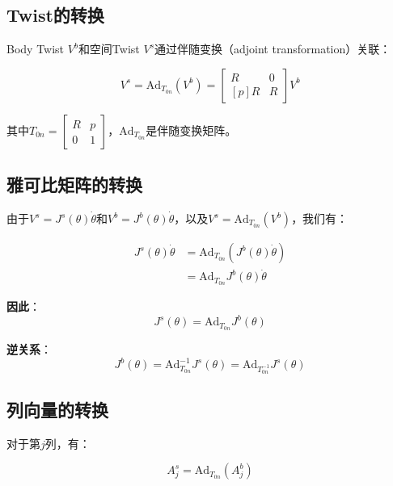 \documentclass[12pt,a4paper]{article}
\begin{document}
\subsection{Twist的转换}

Body Twist $V^b$和空间Twist $V^s$通过伴随变换（adjoint transformation）关联：

\begin{equation}
V^s = \text{Ad}_{T_{0n}}(V^b) = \begin{bmatrix} R & 0 \\ [p]R & R \end{bmatrix} V^b
\label{eq:twist_conversion}
\end{equation}

其中$T_{0n} = \begin{bmatrix} R & p \\ 0 & 1 \end{bmatrix}$，$\text{Ad}_{T_{0n}}$是伴随变换矩阵。

\subsection{雅可比矩阵的转换}

由于$V^s = J^s(\theta) \dot{\theta}$和$V^b = J^b(\theta) \dot{\theta}$，以及$V^s = \text{Ad}_{T_{0n}}(V^b)$，我们有：

\begin{align}
J^s(\theta) \dot{\theta} &= \text{Ad}_{T_{0n}}(J^b(\theta) \dot{\theta}) \\
&= \text{Ad}_{T_{0n}} J^b(\theta) \dot{\theta}
\end{align}

\textbf{因此}：
\begin{equation}
J^s(\theta) = \text{Ad}_{T_{0n}} J^b(\theta)
\label{eq:jacobian_conversion}
\end{equation}

\textbf{逆关系}：
\begin{equation}
J^b(\theta) = \text{Ad}_{T_{0n}}^{-1} J^s(\theta) = \text{Ad}_{T_{0n}^{-1}} J^s(\theta)
\label{eq:jacobian_conversion_inv}
\end{equation}

\subsection{列向量的转换}

对于第$j$列，有：

\begin{equation}
A_j^s = \text{Ad}_{T_{0n}}(A_j^b)
\label{eq:column_conversion}
\end{equation}
\end{document}
